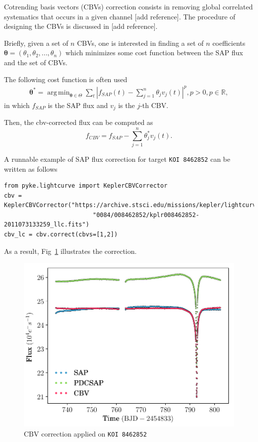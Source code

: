 \documentclass{article}
\DeclareMathOperator*{\argmin}{arg\,min}
\begin{document}
Cotrending basis vectors (CBVs) correction consists in removing global correlated
systematics that occurs in a given channel [add reference]. The procedure of
designing the CBVs is discussed in [add reference].

Briefly, given a set of $n$ CBVs, one is interested in finding a set of $n$
coefficients $\bm{\theta}=(\theta_1, \theta_2, ..., \theta_n)$ which minimizes
some cost function between the SAP flux and the set of CBVs.

The following cost function is often used
\begin{align}
    \bm{\theta}^{*} = \argmin_{\bm{\theta} \in \Theta} \sum_{t}|f_{SAP}(t)
    - \sum_{j=1}^{n}\theta_j v_{j}(t)|^p, p>0, p \in \mathbb{R},
\end{align}
in which $f_{SAP}$ is the SAP flux and $v_j$ is the $j$-th CBV.

Then, the cbv-corrected flux can be computed as
\begin{equation}
    f_{CBV} = f_{SAP} - \sum_{j=1}^{n}\theta^{*}_j v_{j}(t).
\end{equation}

A runnable example of SAP flux correction for target \texttt{KOI 8462852}
can be written as follows
\begin{verbatim}
from pyke.lightcurve import KeplerCBVCorrector
cbv = KeplerCBVCorrector("https://archive.stsci.edu/missions/kepler/lightcurves/"
                         "0084/008462852/kplr008462852-2011073133259_llc.fits")
cbv_lc = cbv.correct(cbvs=[1,2])
\end{verbatim}

As a result, Fig~\ref{fig:cbv-correction} illustrates the correction.
\begin{figure}[!htb]
    \centering
    \includegraphics[scale=.5]{figs/cbv.pdf}
    \caption{CBV correction applied on \texttt{KOI 8462852}}
    \label{fig:cbv-correction}
\end{figure}
\end{document}
